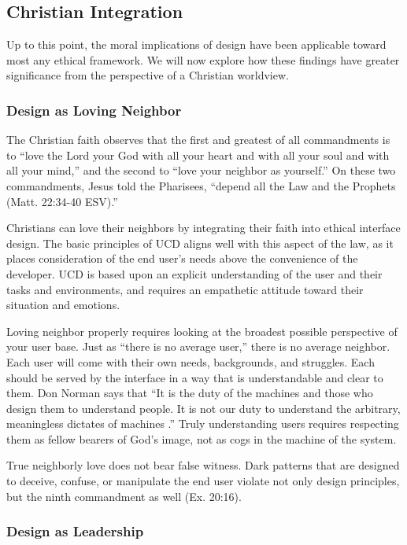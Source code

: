 \documentclass[12pt, oneside]{article}
\begin{document}
\subsection{Christian Integration}

Up to this point, the moral implications of design have been applicable toward most any ethical framework. We will now explore how these findings have greater significance from the perspective of a Christian worldview.

\subsubsection{Design as Loving Neighbor}

The Christian faith observes that the first and greatest of all commandments is to ``love the Lord your God with all your heart and with all your soul and with all your mind,'' and the second to ``love your neighbor as yourself.'' On these two commandments, Jesus told the Pharisees, ``depend all the Law and the Prophets (Matt. 22:34-40 ESV).''

Christians can love their neighbors by integrating their faith into ethical interface design. The basic principles of UCD aligns well with this aspect of the law, as it places consideration of the end user's needs above the convenience of the developer. UCD is based upon an explicit understanding of the user and their tasks and environments, and requires an empathetic attitude toward their situation and emotions.

Loving neighbor properly requires looking at the broadest possible perspective of your user base. Just as ``there is no average user,'' there is no average neighbor. Each user will come with their own needs, backgrounds, and struggles. Each should be served by the interface in a way that is understandable and clear to them. Don Norman says that ``It is the duty of the machines and those who design them to understand people. It is not our duty to understand the arbitrary, meaningless dictates of machines \cite[p.~6]{norman_2013}.'' Truly understanding users requires respecting them as fellow bearers of God's image, not as cogs in the machine of the system.

True neighborly love does not bear false witness. Dark patterns that are designed to deceive, confuse, or manipulate the end user violate not only design principles, but the ninth commandment as well (Ex. 20:16).

\subsubsection{Design as Leadership}
\end{document}
